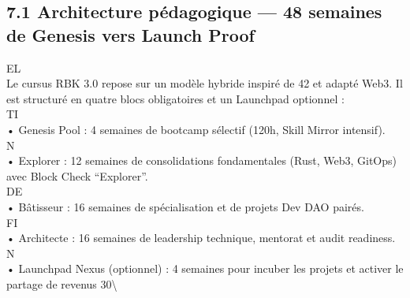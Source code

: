 \documentclass[12pt,landscape,a4paper]{article}
\begin{document}
\subsection{7.1 Architecture pédagogique — 48 semaines de Genesis vers Launch Proof}
\vspace{0.5em}
\vspace{0.5em}
\vspace{0.5em}
\vspace{0.5em}
EL\\
Le cursus RBK 3.0 repose sur un modèle hybride inspiré de 42 et adapté Web3. Il est structuré en quatre blocs obligatoires et un Launchpad optionnel :\\
\vspace{0.5em}
\vspace{0.5em}
\vspace{0.5em}
\vspace{0.5em}
TI\\
• Genesis Pool : 4 semaines de bootcamp sélectif (120h, Skill Mirror intensif).\\
\vspace{0.5em}
\vspace{0.5em}
\vspace{0.5em}
\vspace{0.5em}
N\\
• Explorer : 12 semaines de consolidations fondamentales (Rust, Web3, GitOps) avec Block Check “Explorer”.\\
\vspace{0.5em}
\vspace{0.5em}
\vspace{0.5em}
\vspace{0.5em}
DE\\
• Bâtisseur : 16 semaines de spécialisation et de projets Dev DAO pairés.\\
\vspace{0.5em}
\vspace{0.5em}
\vspace{0.5em}
\vspace{0.5em}
FI\\
• Architecte : 16 semaines de leadership technique, mentorat et audit readiness.\\
\vspace{0.5em}
\vspace{0.5em}
\vspace{0.5em}
N\\
• Launchpad Nexus (optionnel) : 4 semaines pour incuber les projets et activer le partage de revenus 30\textbackslash{}%
\end{document}
